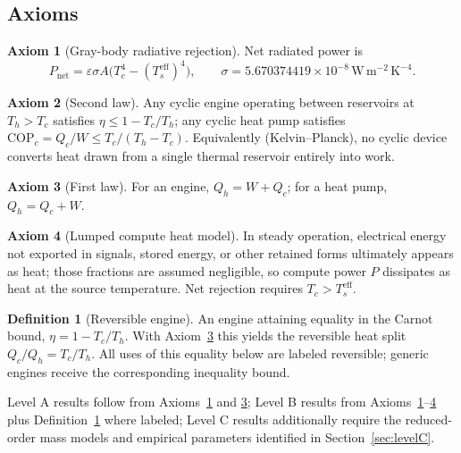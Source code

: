 \documentclass[11pt]{article}
\theoremstyle{definition}
\newtheorem{axiom}{Axiom}
\newtheorem{definition}{Definition}
\theoremstyle{remark}
\newcommand{\Th}{T_h}
\newcommand{\Tc}{T_c}
\newcommand{\Ts}{T_s^{\mathrm{eff}}}
\newcommand{\eps}{\varepsilon}
\begin{document}
\subsection{Axioms}

\begin{axiom}[Gray-body radiative rejection]\label{ax:sb}
Net radiated power is
\begin{equation}
P_{\mathrm{net}}=\eps\sigma A\bigl(\Tc^{4}-(\Ts)^{4}\bigr),
\qquad \sigma=5.670374419\times10^{-8}\,\mathrm{W\,m^{-2}\,K^{-4}}.
\label{eq:sb}
\end{equation}
\end{axiom}

\begin{axiom}[Second law]\label{ax:carnot}
Any cyclic engine operating between reservoirs at $\Th>\Tc$ satisfies $\eta\le1-\Tc/\Th$; any cyclic heat pump satisfies $\mathrm{COP}_{c}=Q_{c}/W\le \Tc/(\Th-\Tc)$. Equivalently (Kelvin--Planck), no cyclic device converts heat drawn from a single thermal reservoir entirely into work.
\end{axiom}

\begin{axiom}[First law]\label{ax:first}
For an engine, $Q_{h}=W+Q_{c}$; for a heat pump, $Q_{h}=Q_{c}+W$.
\end{axiom}

\begin{axiom}[Lumped compute heat model]\label{ax:compute}
In steady operation, electrical energy not exported in signals, stored energy, or other retained forms ultimately appears as heat; those fractions are assumed negligible, so compute power $P$ dissipates as heat at the source temperature. Net rejection requires $\Tc>\Ts$.
\end{axiom}

\begin{definition}[Reversible engine]\label{def:rev}
An engine attaining equality in the Carnot bound, $\eta=1-\Tc/\Th$. With Axiom~\ref{ax:first} this yields the reversible heat split $Q_{c}/Q_{h}=\Tc/\Th$. All uses of this equality below are labeled reversible; generic engines receive the corresponding inequality bound.
\end{definition}

Level A results follow from Axioms~\ref{ax:sb} and \ref{ax:first}; Level B results from Axioms~\ref{ax:sb}--\ref{ax:compute} plus Definition~\ref{def:rev} where labeled; Level C results additionally require the reduced-order mass models and empirical parameters identified in Section~\ref{sec:levelC}.
\end{document}
